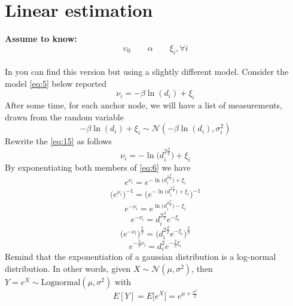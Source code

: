 \documentclass[12pt]{report}
\begin{document}
\section{Linear estimation}
\textbf{Assume to know:} $$\upsilon_0\qquad \alpha\qquad\xi_i,\forall i$$\\
In \cite{rzk} you can find this version but using a slightly different model.
Consider the model \ref{eq:5} below reported
\begin{equation}
    \nu_i=-\beta\ln(d_i)+\xi_i
    \label{eq:15}
\end{equation}
After some time, for each anchor node, we will have a list of measurements, drawn from the random variable 
\begin{equation}
-\beta\ln(d_i)+\xi_i\sim \mathcal{N}(-\beta\ln(d_i),\sigma_i^2)
\label{eq:14}
\end{equation}
Rewrite the \ref{eq:15} as follows 
\begin{equation}
    \nu_i=-\ln\big(d_i^{2\frac{\beta}{2}}\big)+\xi_i
    \label{eq:6}
\end{equation}
By exponentiating both members of \ref{eq:6} we have 
\begin{equation}
    e^{\nu_i}=e^{-\ln\big(d_i^{2\frac{\beta}{2}}\big)+\xi_i}
\end{equation}
\begin{equation}
    \bigg(e^{\nu_i}\bigg)^{-1}=\bigg(e^{-\ln\big(d_i^{2\frac{\beta}{2}}\big)+\xi_i}\bigg)^{-1}
\end{equation}
\begin{equation}
    e^{-\nu_i}=e^{\ln\big(d_i^{2\frac{\beta}{2}}\big)-\xi_i}
\end{equation}
\begin{equation}
    e^{-\nu_i}=d_i^{2\frac{\beta}{2}}e^{-\xi_i}
\end{equation}
\begin{equation}
    \bigg(e^{-\nu_i}\bigg)^{\frac{2}{\beta}}=\bigg(d_i^{2\frac{\beta}{2}}e^{-\xi_i}\bigg)^{\frac{2}{\beta}}
\end{equation}
\begin{equation}
    e^{-\frac{2}{\beta}\nu_i}=d_i^2e^{-\frac{2}{\beta}\xi_i}
\end{equation}
Remind that the exponentiation of a gaussian distribution is \cite{Beran2011} a log-normal distribution. In other words, given $X\sim \mathcal{N}(\mu,\sigma^2)$, then $Y=e^X\sim \text{Lognormal}(\mu,\sigma^2)$ with
\begin{equation}
    E[Y]=E\big[e^X\big]=e^{\mu+\frac{\sigma^2}{2}}
    \label{eq:20}
\end{equation}
\end{document}
